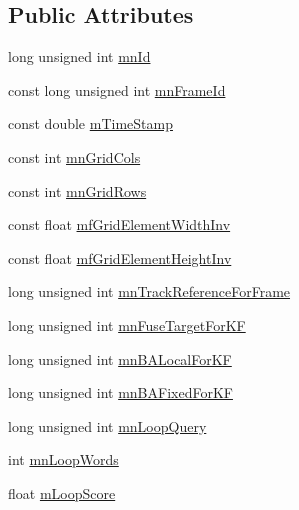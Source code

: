 \subsection*{Public Attributes}
\begin{DoxyCompactItemize}
\item 
long unsigned int \mbox{\hyperlink{class_o_r_b___s_l_a_m2_1_1_key_frame_a1e3d56caca4e4cc372c36a3270d490c7}{mn\+Id}}
\item 
const long unsigned int \mbox{\hyperlink{class_o_r_b___s_l_a_m2_1_1_key_frame_a75ad29c06d8c969a341d9f633b43569e}{mn\+Frame\+Id}}
\item 
const double \mbox{\hyperlink{class_o_r_b___s_l_a_m2_1_1_key_frame_ab4fa3d61a524547cfe2be2523d199833}{m\+Time\+Stamp}}
\item 
const int \mbox{\hyperlink{class_o_r_b___s_l_a_m2_1_1_key_frame_a7fe0d03aabb1643abb8f4eef33fdf95a}{mn\+Grid\+Cols}}
\item 
const int \mbox{\hyperlink{class_o_r_b___s_l_a_m2_1_1_key_frame_afb859eb91a2365180b006a185aa36ba6}{mn\+Grid\+Rows}}
\item 
const float \mbox{\hyperlink{class_o_r_b___s_l_a_m2_1_1_key_frame_a7ad664a3275b80e901f3fa290ad7804e}{mf\+Grid\+Element\+Width\+Inv}}
\item 
const float \mbox{\hyperlink{class_o_r_b___s_l_a_m2_1_1_key_frame_a89412cd7a6d467c262a7c3a584c81990}{mf\+Grid\+Element\+Height\+Inv}}
\item 
long unsigned int \mbox{\hyperlink{class_o_r_b___s_l_a_m2_1_1_key_frame_a1c775159303dc3435fc05e73f30f2865}{mn\+Track\+Reference\+For\+Frame}}
\item 
long unsigned int \mbox{\hyperlink{class_o_r_b___s_l_a_m2_1_1_key_frame_a2bad332e7057e8f59d630e78c7994129}{mn\+Fuse\+Target\+For\+KF}}
\item 
long unsigned int \mbox{\hyperlink{class_o_r_b___s_l_a_m2_1_1_key_frame_a75767b3e2e5f8eb4b4b73cba161b097b}{mn\+B\+A\+Local\+For\+KF}}
\item 
long unsigned int \mbox{\hyperlink{class_o_r_b___s_l_a_m2_1_1_key_frame_a484457e131f76713de4dc4e0bc9b5fed}{mn\+B\+A\+Fixed\+For\+KF}}
\item 
long unsigned int \mbox{\hyperlink{class_o_r_b___s_l_a_m2_1_1_key_frame_ae3446f5fd861f1e51faf9191c1eb75ab}{mn\+Loop\+Query}}
\item 
int \mbox{\hyperlink{class_o_r_b___s_l_a_m2_1_1_key_frame_a36d7ead1b29c188be610208f11625d24}{mn\+Loop\+Words}}
\item 
float \mbox{\hyperlink{class_o_r_b___s_l_a_m2_1_1_key_frame_a40712f54ab899a6dbd795405a4984ab5}{m\+Loop\+Score}}

\end{DoxyCompactItemize}
